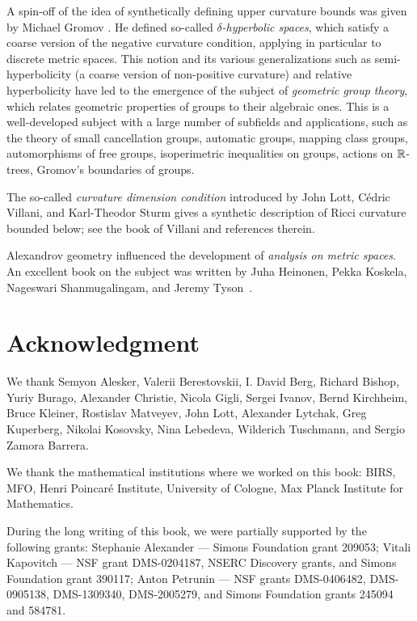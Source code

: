 A spin-off of the idea of synthetically defining upper curvature bounds 
was given by Michael Gromov \cite{gromov:hyp-groups}. 
He  defined so-called  {}\emph{$\delta$-hyperbolic spaces}, which satisfy   a coarse version of the  negative curvature condition, applying  in particular to discrete metric spaces.
This notion and its various generalizations such as semi-hyperbolicity (a coarse version of non-positive curvature) and relative hyperbolicity have  led to the emergence of the subject of {}\emph{geometric group theory}, which relates geometric properties of groups to their algebraic ones.
This is a well-developed subject with a large number of subfields and applications, such as the theory of small cancellation groups, automatic groups,  mapping class groups, automorphisms of free groups, isoperimetric inequalities on groups, actions on $\mathbb{R}$-trees, Gromov's boundaries of groups.

{\sloppy

The so-called {}\emph{curvature dimension condition} introduced by John Lott, C\'edric Villani, and Karl-Theodor Sturm gives a synthetic description of Ricci curvature bounded below; see the book of Villani \cite{villani} and references therein.

Alexandrov geometry influenced the development of {}\emph{analysis on metric spaces}. 
An excellent book on the subject was written by Juha Heinonen, Pekka Koskela, Nageswari Shanmugalingam, and Jeremy Tyson~\cite{heinonen-koskela-shanmugalingam-tyson}.

}

\section*{Acknowledgment}
We thank 
Semyon Alesker,
Valerii Berestovskii,
I. David Berg,
Richard Bishop, 
Yuriy Burago, 
Alexander Christie,
Nicola Gigli,
Sergei Ivanov,
Bernd Kirchheim, 
Bruce Kleiner, 
Rostislav Matveyev,
John Lott,
Alexander Lytchak, 
Greg Kuperberg, 
Nikolai Kosovsky, 
Nina Lebedeva,
Wilderich Tuschmann, 
and
Sergio Zamora Barrera.

We thank the mathematical institutions where we worked on this book: 
BIRS, 
MFO, 
Henri Poincar\'{e} Institute,
University of Cologne, 
Max Planck Institute for Mathematics.


During the long writing of this book, we were partially supported by the following grants:
Stephanie Alexander --- 
Simons Foundation grant 209053;
Vitali Kapovitch ---  NSF grant DMS-0204187, NSERC Discovery grants, and Simons Foundation grant 390117;
Anton Petrunin --- 
NSF grants
DMS-0406482,
DMS-0905138,
DMS-1309340,
DMS-2005279,
and Simons Foundation grants 
245094 and 584781.

